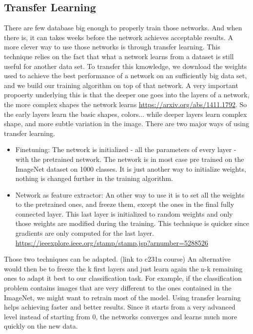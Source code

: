 \subsection{Transfer Learning}
There are few database big enough to properly train those networks. And when there is, it can takes weeks before the network achieves acceptable results. A more clever way to use those networks is through transfer learning. This technique relies on the fact that what a network learns from a dataset is still useful for another data set. To transfer this kmowledge,  we download the weights used to achieve the best performance of a network on an sufficiently big data set, and we build our training algorithm on top of that network. A very important propoerty underlying this is that the deeper one goes into the layers of a network, the more complex shapes the network learns \url{https://arxiv.org/abs/1411.1792}. So the early layers learn the basic shapes, colors... while deeper layers learn complex shape, and more subtle variation in the image. 
There are two major ways of using transfer learning. 
\begin{itemize}
    \item Finetuning: The network is initialized - all the parameters of every layer - with the pretrained network. The network is in most case pre trained on the ImageNet dataset on 1000 classes. It is just another way to initialize weights, nothing is changed further in the training algorithm.
    \item Network as feature extractor: An other way to use it is to set all the weights to the pretrained ones, and freeze them, except the ones in the final fully connected layer. This last layer is initialized to random weights and only those weights are modified during the training. 
    This technique is quicker since gradients are only computed for the last layer. \url{https://ieeexplore.ieee.org/stamp/stamp.jsp?arnumber=5288526}
\end{itemize}
Those two techniques can be adapted.  (link to c231n course) An alternative would then be to freeze the k first layers and just learn again the n-k remaining ones to adapt it best to our classification task. For example, if the classification problem contains images that are very different to the ones contained in the ImageNet, we might want to retrain most of the model. 
Using transfer learning helps achieving faster and better results. Since it starts from a very advanced level instead of starting from 0, the networks converges and learns much more quickly on the new data.